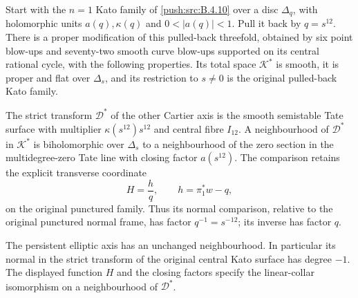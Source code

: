 \begin{proposition}\hypertarget{tag-030Q}{}\label{push:src:B.4.21}

Start with the $n=1$ Kato family of \ref{push:src:B.4.10} over a disc
$\Delta_q$, with holomorphic units $a(q),\kappa(q)$ and
$0<|a(q)|<1$.  Pull it back by $q=s^{12}$.
There is a proper modification of this pulled-back threefold,
obtained by six point blow-ups and seventy-two smooth curve
blow-ups supported on its central rational cycle, with the
following properties.  Its total space $\mathcal K^*$ is smooth,
it is proper and flat over $\Delta_s$, and its restriction to
$s\ne0$ is the original pulled-back Kato family.

The strict transform $\mathcal D^*$ of the other Cartier axis
is the smooth semistable Tate surface with multiplier
$\kappa(s^{12})s^{12}$ and central fibre $I_{12}$.  A neighbourhood
of $\mathcal D^*$ in $\mathcal K^*$ is biholomorphic over
$\Delta_s$ to a neighbourhood of the zero section in the
multidegree-zero Tate line with closing factor $a(s^{12})$.
The comparison retains the explicit transverse coordinate
\begin{equation}
 H=\frac{h}{q},\qquad h=\pi_1^*w-q,
\label{pub:I:eq:B-4-21-1}
\end{equation}
on the original punctured family.  Thus its normal comparison,
relative to the original punctured normal frame, has factor
$q^{-1}=s^{-12}$; its inverse has factor $q$.

The persistent elliptic axis has an unchanged neighbourhood.
In particular its normal in the strict transform of the original
central Kato surface has degree $-1$.
The displayed function $H$ and the closing factors specify the
linear-collar isomorphism on a neighbourhood of $\mathcal D^*$.
\end{proposition}


